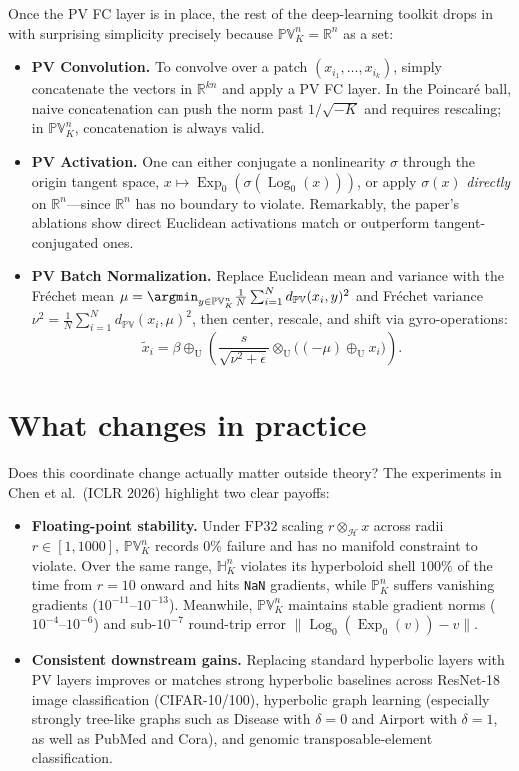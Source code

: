 Once the PV FC layer is in place, the rest of the deep-learning toolkit drops in with surprising simplicity precisely because \(\mathbb{PV}_K^n = \mathbb{R}^n\) as a set:
\begin{itemize}
  \item \textbf{PV Convolution.} To convolve over a patch \((x_{i_1},\ldots,x_{i_k})\), simply concatenate the vectors in \(\mathbb{R}^{kn}\) and apply a PV FC layer. In the Poincar\'e ball, naive concatenation can push the norm past \(1/\sqrt{-K}\) and requires rescaling; in \(\mathbb{PV}_K^n\), concatenation is always valid.
  \item \textbf{PV Activation.} One can either conjugate a nonlinearity \(\sigma\) through the origin tangent space, \(x\mapsto \operatorname{Exp}_0(\sigma(\operatorname{Log}_0(x)))\), or apply \(\sigma(x)\) \emph{directly} on \(\mathbb{R}^n\)---since \(\mathbb{R}^n\) has no boundary to violate. Remarkably, the paper's ablations show direct Euclidean activations match or outperform tangent-conjugated ones.
  \item \textbf{PV Batch Normalization.} Replace Euclidean mean and variance with the Fr\'echet mean \(\mu = \argmin_{y\in\mathbb{PV}_K^n}\frac{1}{N}\sum_{i=1}^N d_{\mathbb{PV}}(x_i,y)^2\) and Fr\'echet variance \(\nu^2 = \frac{1}{N}\sum_{i=1}^N d_{\mathbb{PV}}(x_i,\mu)^2\), then center, rescale, and shift via gyro-operations:
  \[
    \tilde{x}_i = \beta \oplus_{\mathrm{U}} \left(\frac{s}{\sqrt{\nu^2+\epsilon}} \otimes_{\mathrm{U}} \bigl((-\mu)\oplus_{\mathrm{U}} x_i\bigr)\right).
  \]
\end{itemize}

\section{What changes in practice}

Does this coordinate change actually matter outside theory? The experiments in Chen et al.\ (ICLR 2026) highlight two clear payoffs:
\begin{itemize}
  \item \textbf{Floating-point stability.} Under \(\mathrm{FP32}\) scaling \(r\otimes_{\mathcal{H}} x\) across radii \(r\in[1,1000]\), \(\mathbb{PV}_K^n\) records \(0\%\) failure and has no manifold constraint to violate. Over the same range, \(\mathbb{H}_K^n\) violates its hyperboloid shell \(100\%\) of the time from \(r=10\) onward and hits \texttt{NaN} gradients, while \(\mathbb{P}_K^n\) suffers vanishing gradients (\(10^{-11}\text{--}10^{-13}\)). Meanwhile, \(\mathbb{PV}_K^n\) maintains stable gradient norms (\(10^{-4}\text{--}10^{-6}\)) and sub-\(10^{-7}\) round-trip error \(\|\operatorname{Log}_0(\operatorname{Exp}_0(v))-v\|\).
  \item \textbf{Consistent downstream gains.} Replacing standard hyperbolic layers with PV layers improves or matches strong hyperbolic baselines across ResNet-18 image classification (CIFAR-10/100), hyperbolic graph learning (especially strongly tree-like graphs such as Disease with \(\delta=0\) and Airport with \(\delta=1\), as well as PubMed and Cora), and genomic transposable-element classification.
\end{itemize}

